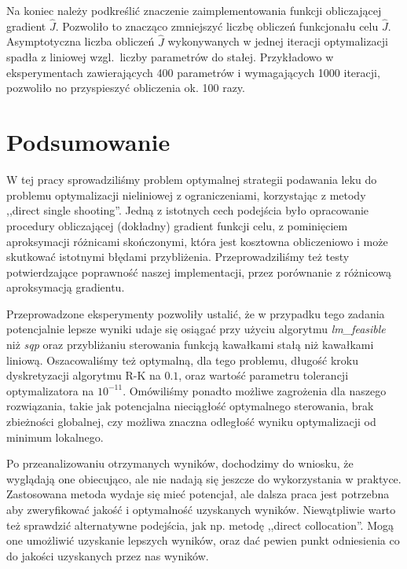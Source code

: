 \documentclass[licencjacka]{pracamgr}
\begin{document}
Na koniec należy podkreślić znaczenie zaimplementowania funkcji obliczającej gradient $\hat{J}$. Pozwoliło to znacząco zmniejszyć liczbę obliczeń funkcjonału celu $\hat{J}$. Asymptotyczna liczba obliczeń $\hat{J}$ wykonywanych w jednej iteracji optymalizacji spadła z liniowej wzgl.\ liczby parametrów do stałej. Przykładowo w eksperymentach zawierających 400 parametrów i wymagających 1000 iteracji, pozwoliło no przyspieszyć obliczenia ok. 100 razy.

\chapter{Podsumowanie}
W tej pracy sprowadziliśmy problem optymalnej strategii podawania leku do problemu optymalizacji nieliniowej z ograniczeniami, korzystając z metody ,,direct single shooting''. Jedną z istotnych cech podejścia było opracowanie procedury obliczającej (dokładny) gradient funkcji celu, z pominięciem aproksymacji różnicami skończonymi, która jest kosztowna obliczeniowo i może skutkować istotnymi błędami przybliżenia. Przeprowadziliśmy też testy potwierdzające poprawność naszej implementacji, przez porównanie z różnicową aproksymacją gradientu.

Przeprowadzone eksperymenty pozwoliły ustalić, że w przypadku tego zadania potencjalnie lepsze wyniki udaje się osiągać przy użyciu algorytmu {\it lm\_feasible\/} niż {\it sqp\/} oraz przybliżaniu sterowania funkcją kawałkami stałą niż kawałkami liniową. Oszacowaliśmy też optymalną, dla tego problemu, długość kroku dyskretyzacji algorytmu R-K na $0.1$, oraz wartość parametru tolerancji optymalizatora na $10^{-11}$. Omówiliśmy ponadto możliwe zagrożenia dla naszego rozwiązania, takie jak potencjalna nieciągłość optymalnego sterowania, brak zbieżności globalnej, czy możliwa znaczna odległość wyniku optymalizacji od minimum lokalnego.

Po przeanalizowaniu otrzymanych wyników, dochodzimy do wniosku, że wyglądają one obiecująco, ale nie nadają się jeszcze do wykorzystania w praktyce. Zastosowana metoda wydaje się mieć potencjał, ale dalsza praca jest potrzebna aby zweryfikować jakość i optymalność uzyskanych wyników. Niewątpliwie warto też sprawdzić alternatywne podejścia, jak np. metodę ,,direct collocation''. Mogą one umożliwić uzyskanie lepszych wyników, oraz dać pewien punkt odniesienia co do jakości uzyskanych przez nas wyników.

\newpage{}
{}

\end{document}
